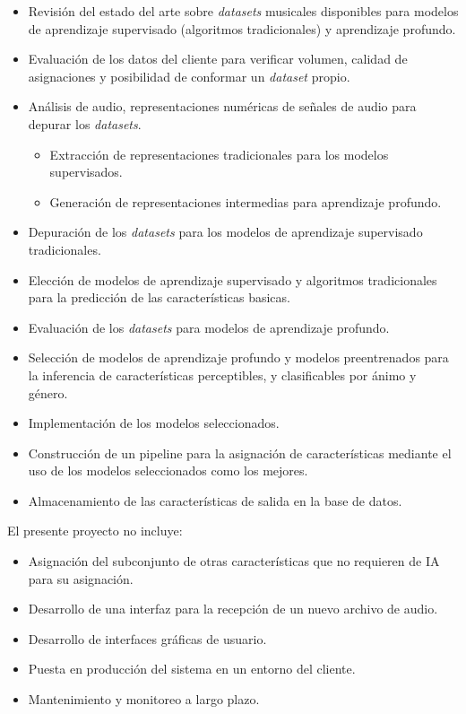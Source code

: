 \documentclass[
11pt, %
]{charter}
\begin{document}
\begin{itemize}
  \item Revisión del estado del arte sobre \textit{datasets} musicales disponibles para modelos de aprendizaje supervisado (algoritmos tradicionales) y aprendizaje profundo.
  \item Evaluación de los datos del cliente para verificar volumen, calidad de asignaciones y posibilidad de conformar un \textit{dataset} propio.
  \item Análisis de audio, representaciones numéricas de señales de audio para depurar los \textit{datasets}.
  \begin{itemize}
    \item Extracción de representaciones tradicionales para los modelos supervisados.
		\item Generación de representaciones intermedias para aprendizaje profundo.
	\end{itemize}
  \item Depuración de los \textit{datasets} para los modelos de aprendizaje supervisado tradicionales.
	\item Elección de modelos de aprendizaje supervisado y algoritmos tradicionales para la predicción de las características basicas.
  \item Evaluación de los \textit{datasets} para modelos de aprendizaje profundo.
  \item Selección de modelos de aprendizaje profundo y modelos preentrenados para la inferencia de características perceptibles, y clasificables por ánimo y género.
  \item Implementación de los modelos seleccionados.
  \item Construcción de un pipeline para la asignación de características mediante el uso de los modelos seleccionados como los mejores.
  \item Almacenamiento de las características de salida en la base de datos.
\end{itemize}



El presente proyecto no incluye:
\begin{itemize}
  \item Asignación del subconjunto de otras características que no requieren de IA para su asignación.
  \item Desarrollo de una interfaz para la recepción de un nuevo archivo de audio.
  \item Desarrollo de interfaces gráficas de usuario.
  \item Puesta en producción del sistema en un entorno del cliente.
  \item Mantenimiento y monitoreo a largo plazo.
\end{itemize}
\end{document}
